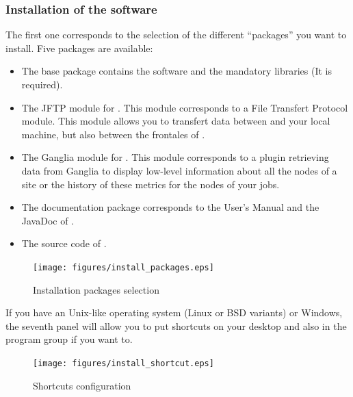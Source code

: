 \subsubsection{Installation of the software}

The first one corresponds to the selection of the different ``packages''
you want to install. Five packages are available:
\begin{itemize}
  \item The base package contains the software and the mandatory libraries (It
  is required).
  \item The JFTP module for \grudu. This module corresponds to a File Transfert
  Protocol module. This module allows you to transfert data between \gfk and
  your local machine, but also between the frontales of \gfk. 
  \item The Ganglia module for \grudu. This module corresponds to a plugin
  retrieving data from Ganglia to display low-level information about all the
  nodes of a site or the history of these metrics for the nodes of your jobs.  
  \item The documentation package corresponds to the User's Manual and the JavaDoc of \grudu.
  \item The source code of \grudu.
\end{itemize}
\begin{figure}[H]
\begin{center}
\texttt{[image: figures/install\_packages.eps]}
\caption{Installation packages selection}
\end{center}
\end{figure}
If you have an Unix-like operating system (Linux or BSD variants) or
Windows, the seventh panel will allow you to put shortcuts on your desktop and
also in the program group if you want to.\\
\begin{figure}[H]
\begin{center}
\texttt{[image: figures/install\_shortcut.eps]}
\caption{Shortcuts configuration}
\end{center}
\end{figure}

